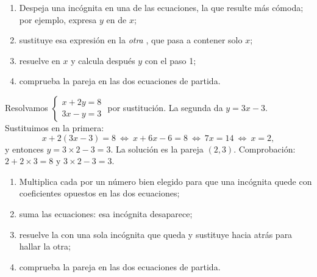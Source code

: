 \begin{method}[Sustitución]\label{met:g10:lines:substitution}
\begin{enumerate}
  \item Despeja una incógnita en una de las ecuaciones, la que resulte más
        cómoda; por ejemplo, expresa $y$ en  de $x$;
  \item sustituye esa expresión en la \emph{otra} , que pasa a
        contener solo $x$;
  \item resuelve en $x$ y calcula después $y$ con el paso 1;
  \item comprueba la pareja en las dos ecuaciones de partida.
\end{enumerate}
\end{method}

\begin{example}\label{ex:g10:lines:substitution}
Resolvamos $\begin{cases} x + 2y = 8 \\ 3x - y = 3 \end{cases}$ por
sustitución. La segunda  da $y = 3x - 3$. Sustituimos en la
primera:
\[
x + 2(3x - 3) = 8
\ \Longleftrightarrow\
x + 6x - 6 = 8
\ \Longleftrightarrow\
7x = 14
\ \Longleftrightarrow\
x = 2 ,
\]
y entonces $y = 3 \times 2 - 3 = 3$. La solución es la pareja $(2, 3)$.
Comprobación: $2 + 2 \times 3 = 8$ y $3 \times 2 - 3 = 3$.
\end{example}

\begin{method}[Reducción]\label{met:g10:lines:elimination}
\begin{enumerate}
  \item Multiplica cada  por un número bien elegido para que una
        incógnita quede con coeficientes opuestos en las dos ecuaciones;
  \item suma las ecuaciones: esa incógnita desaparece;
  \item resuelve la \omterm{def:g10:algebra:equation}{ecuación} con una sola incógnita que queda y sustituye
        hacia atrás para hallar la otra;
  \item comprueba la pareja en las dos ecuaciones de partida.
\end{enumerate}
\end{method}


